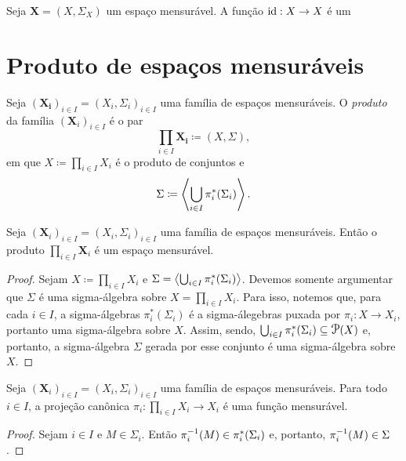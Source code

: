 \begin{prop}
Seja $\bm X = (X,\Sigma_X)$ um espaço mensurável. A função $\mathrm{id}: X \to X$ é um 
\end{prop}


\clearpage
\section{Produto de espaços mensuráveis}

\begin{defi}
Seja $(\bm{X_i})_{i \in I} = (X_i,\Sigma_i)_{i \in I}$ uma família de espaços mensuráveis. O \emph{produto} da família $(\bm X_i)_{i \in I}$ é o par
	\begin{equation*}
	\prod_{i \in I} \bm{X_i} \coloneqq (X,\Sigma),
	\end{equation*}
em que $X \coloneqq \prod_{i \in I} X_i$ é o produto de conjuntos e
	\begin{equation*}
	\Sigma \coloneqq \ger{\bigcup_{i \in I} \pi_i^*(\Sigma_i)}.
	\end{equation*}
\end{defi}

\begin{prop}
Seja $(\bm X_i)_{i \in I} = (X_i,\Sigma_i)_{i \in I}$ uma família de espaços mensuráveis. Então o produto $\prod_{i \in I} \bm X_i$ é um espaço mensurável.
\end{prop}
\begin{proof}
Sejam $X \coloneqq \prod_{i \in I} X_i$ e $\Sigma=\left\langle \bigcup_{i \in I} \pi_i^*(\Sigma_i) \right\rangle$. Devemos somente argumentar que $\Sigma$ é uma sigma-álgebra sobre $X= \prod_{i \in I} X_i$. Para isso, notemos que, para cada $i \in I$, a sigma-álgebras $\pi_i^*(\Sigma_i)$ é a sigma-álegebras puxada por $\pi_i: X \to X_i$, portanto uma sigma-álgebra sobre $X$. Assim, sendo, $\bigcup_{i \in I} \pi_i^*(\Sigma_i) \subseteq \p(X)$ e, portanto, a sigma-álgebra $\Sigma$ gerada por esse conjunto é uma sigma-álgebra sobre $X$.
\end{proof}

\begin{prop}
Seja $(\bm X_i)_{i \in I} = (X_i,\Sigma_i)_{i \in I}$ uma família de espaços mensuráveis. Para todo $i \in I$, a projeção canônica $\pi_i: \prod_{i \in I} X_i \to X_i$ é uma função mensurável.
\end{prop}
\begin{proof}
Sejam $i \in I$ e $M \in \Sigma_i$. Então $\pi_i^{-1}(M) \in \pi_i^*(\Sigma_i)$ e, portanto, $\pi_i^{-1}(M) \in \Sigma$.
\end{proof}

